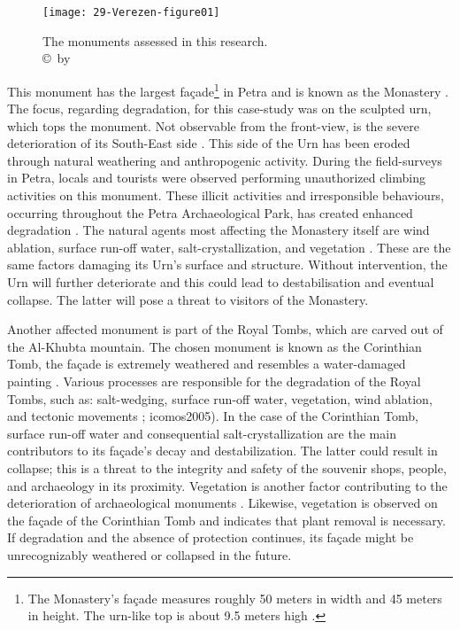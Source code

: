 \begin{figure}[!htb]
	\texttt{[image: 29-Verezen-figure01]}
	\caption{The monuments assessed in this research.
		{\normalfont\scriptsize \\ \copyright\ by \shortauthor
	}}
	\label{fig:29-Verezen-figure01}
\end{figure}

This  monument has the largest façade\footnote{The Monastery’s façade measures roughly 50 meters in width and 45 meters in height. The urn-like top is about 9.5 meters high \parencites[117--121]{maqsood1994}[129--130]{alshawabkehy2010}.}  in Petra and is known as the Monastery \parencite[117--121]{maqsood1994}.
The focus, regarding degradation, for this case-study was on the sculpted urn, which tops the monument.
Not observable from the front-view, is the severe deterioration of its South-East side .
This side of the Urn has been eroded through natural weathering and anthropogenic activity.
During the field-surveys in Petra, locals and tourists were observed performing unauthorized climbing activities on this monument.
These illicit activities and irresponsible behaviours, occurring throughout the Petra Archaeological Park,
has created enhanced degradation \parencite[86]{paolini2012}.
The natural agents most affecting the Monastery itself are wind ablation, surface run-off water, salt-crystallization, and
vegetation \parencites[126--130]{alshawabkehy2010}[1--2]{doehne2002}.
These are the same factors damaging its Urn’s surface and structure.
Without intervention, the Urn will further deteriorate and this could lead to destabilisation and eventual collapse.
The latter will pose a threat to visitors of the Monastery. 

Another  affected monument is part of the Royal Tombs, which are carved out of the Al-Khubta mountain.
The chosen monument is known as the Corinthian Tomb, the façade is extremely weathered and
resembles a water-damaged painting \parencite[257]{sachet2010}.
Various processes are responsible for the degradation of the Royal Tombs, such as: salt-wedging, surface run-off water,
vegetation, wind ablation, and tectonic movements \parencites[267--284]{balaawi2011}[1--3]{doehne2002}[90]{nichols2009}; icomos2005).
In the case of the Corinthian Tomb, surface run-off water and consequential salt-crystallization are the main contributors to
its façade’s decay and destabilization.
The latter could result in collapse; this is a threat to the integrity and safety of the souvenir shops, people, and
archaeology in its proximity.
Vegetation is another factor contributing to the deterioration of archaeological monuments \parencite[267--284]{balaawi2011}.
Likewise, vegetation is observed on the façade of the Corinthian Tomb and indicates that plant removal is necessary.
If degradation and the absence of protection continues, its façade might be unrecognizably weathered or collapsed in the future.

